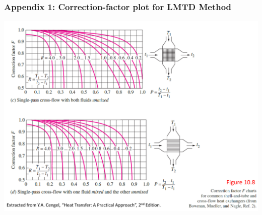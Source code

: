 \documentclass[10pt,compress,unknownkeysallowed]{beamer}
\begin{document}
\begin{frame}
  \frametitle{Appendix 1: Correction-factor plot for LMTD Method}
    \begin{center}
         \includegraphics[width=1.\columnwidth,height=0.65\columnwidth,clip]{./Pics/HE_FFactor2}
    \end{center}
\end{frame}

\end{document}
